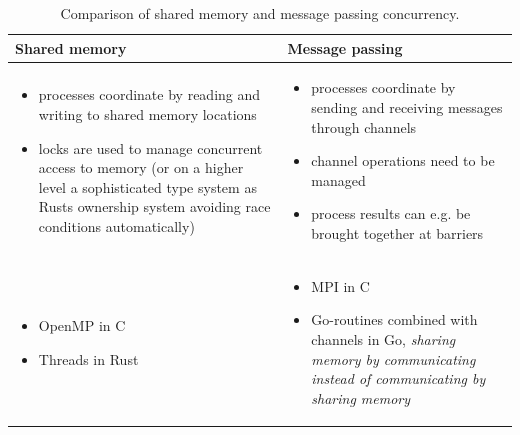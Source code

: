 \begin{table}
    \centering
    \begin{tabular}{|p{}|p{}|}
        \hline
        \textbf{Shared memory} & \textbf{Message passing} \\
        \hline
        \begin{itemize}
            \item processes coordinate by reading and writing 
            to shared memory locations
            \item locks are used to manage concurrent access
            to memory (or on a higher level a sophisticated
            type system as Rusts ownership system avoiding race
            conditions automatically)
        \end{itemize} & \begin{itemize}
            \item processes coordinate by sending and receiving messages through channels
            \item channel operations need to be managed
            \item process results can e.g. be brought together at barriers
        \end{itemize} \\
        \hline
        \begin{itemize}
            \item OpenMP in C
            \item Threads in Rust
        \end{itemize} & \begin{itemize}
            \item MPI in C
            \item Go-routines combined with channels in Go, \textit{sharing memory by communicating instead of communicating by sharing memory}
        \end{itemize} \\
        \hline
    \end{tabular}
    \caption{Comparison of shared memory and message passing concurrency.}
    \label{tab:shared_message}
\end{table}


